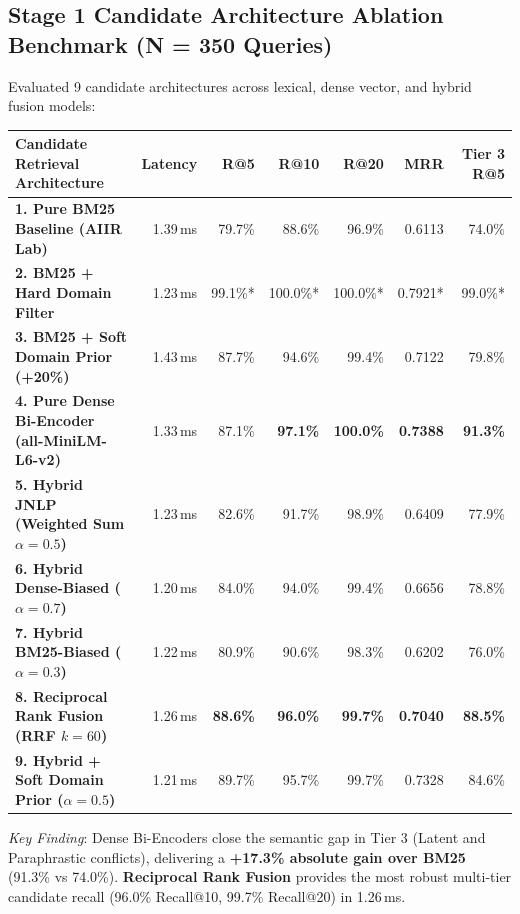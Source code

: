 \documentclass[10pt,letterpaper]{article}
\begin{document}
\subsection{Stage 1 Candidate Architecture Ablation Benchmark (N = 350 Queries)}
Evaluated 9 candidate architectures across lexical, dense vector, and hybrid fusion models:

\vspace{0.4em}
\noindent\begin{tabularx}{\linewidth}{@{}Xrrrrrr@{}}
    \toprule
    \textbf{Candidate Retrieval Architecture} & \textbf{Latency} & \textbf{R@5} & \textbf{R@10} & \textbf{R@20} & \textbf{MRR} & \textbf{Tier 3 R@5} \\
    \midrule
    \textbf{1. Pure BM25 Baseline (AIIR Lab)} & 1.39\,ms & 79.7\% & 88.6\% & 96.9\% & 0.6113 & 74.0\% \\
    \textbf{2. BM25 + Hard Domain Filter} & 1.23\,ms & 99.1\%* & 100.0\%* & 100.0\%* & 0.7921* & 99.0\%* \\
    \textbf{3. BM25 + Soft Domain Prior (+20\%)} & 1.43\,ms & 87.7\% & 94.6\% & 99.4\% & 0.7122 & 79.8\% \\
    \textbf{4. Pure Dense Bi-Encoder (all-MiniLM-L6-v2)} & 1.33\,ms & 87.1\% & \textbf{97.1\%} & \textbf{100.0\%} & \textbf{0.7388} & \textbf{91.3\%} \\
    \textbf{5. Hybrid JNLP (Weighted Sum $\alpha=0.5$)} & 1.23\,ms & 82.6\% & 91.7\% & 98.9\% & 0.6409 & 77.9\% \\
    \textbf{6. Hybrid Dense-Biased ($\alpha=0.7$)} & 1.20\,ms & 84.0\% & 94.0\% & 99.4\% & 0.6656 & 78.8\% \\
    \textbf{7. Hybrid BM25-Biased ($\alpha=0.3$)} & 1.22\,ms & 80.9\% & 90.6\% & 98.3\% & 0.6202 & 76.0\% \\
    \textbf{8. Reciprocal Rank Fusion (RRF $k=60$)} & 1.26\,ms & \textbf{88.6\%} & \textbf{96.0\%} & \textbf{99.7\%} & \textbf{0.7040} & \textbf{88.5\%} \\
    \textbf{9. Hybrid + Soft Domain Prior ($\alpha=0.5$)} & 1.21\,ms & 89.7\% & 95.7\% & 99.7\% & 0.7328 & 84.6\% \\
    \bottomrule
\end{tabularx}
\vspace{0.3em}
\textit{Key Finding}: Dense Bi-Encoders close the semantic gap in Tier 3 (Latent and Paraphrastic conflicts), delivering a \textbf{+17.3\% absolute gain over BM25} (91.3\% vs 74.0\%). \textbf{Reciprocal Rank Fusion} provides the most robust multi-tier candidate recall (96.0\% Recall@10, 99.7\% Recall@20) in 1.26\,ms.
\end{document}
